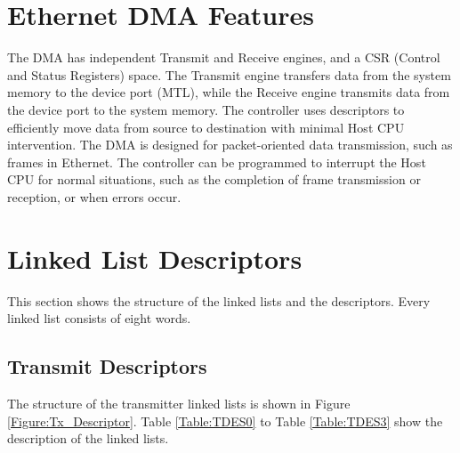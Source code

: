 \documentclass[main\_\_EN.tex]{subfiles}
\begin{document}
\section{Ethernet DMA Features}
The DMA has independent Transmit and Receive engines, and a CSR (Control and Status Registers) space. The Transmit engine transfers data from the system memory to the device port (MTL), while the Receive engine transmits data from the device port to the system memory. The controller uses descriptors to efficiently move data from source to destination with minimal Host CPU intervention. The DMA is designed for packet-oriented data transmission, such as frames in Ethernet. The controller can be programmed to interrupt the Host CPU for normal situations, such as the completion of frame transmission or reception, or when errors occur.

\section{Linked List Descriptors}
\label{section:Linked List Descriptors}

This section shows the structure of the linked lists and the descriptors. Every linked list consists of eight words.

\subsection{Transmit Descriptors}
The structure of the transmitter linked lists is shown in Figure \ref{Figure:Tx_Descriptor}. Table \ref{Table:TDES0} to Table \ref{Table:TDES3} show the  description of the linked lists.
\end{document}
